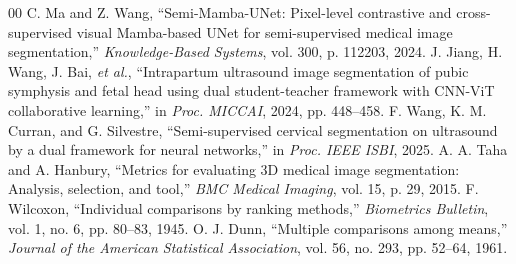 \documentclass{IEEEtran}
\begin{document}
\begin{thebibliography}{00}
 C. Ma and Z. Wang, ``Semi-Mamba-UNet: Pixel-level contrastive and cross-supervised visual Mamba-based UNet for semi-supervised medical image segmentation,'' \textit{Knowledge-Based Systems}, vol. 300, p. 112203, 2024.
 J. Jiang, H. Wang, J. Bai, \textit{et al.}, ``Intrapartum ultrasound image segmentation of pubic symphysis and fetal head using dual student-teacher framework with CNN-ViT collaborative learning,'' in \textit{Proc. MICCAI}, 2024, pp. 448--458.
 F. Wang, K. M. Curran, and G. Silvestre, ``Semi-supervised cervical segmentation on ultrasound by a dual framework for neural networks,'' in \textit{Proc. IEEE ISBI}, 2025.
 A. A. Taha and A. Hanbury, ``Metrics for evaluating 3D medical image segmentation: Analysis, selection, and tool,'' \textit{BMC Medical Imaging}, vol. 15, p. 29, 2015.
 F. Wilcoxon, ``Individual comparisons by ranking methods,'' \textit{Biometrics Bulletin}, vol. 1, no. 6, pp. 80--83, 1945.
 O. J. Dunn, ``Multiple comparisons among means,'' \textit{Journal of the American Statistical Association}, vol. 56, no. 293, pp. 52--64, 1961.
\end{thebibliography}
\end{document}
